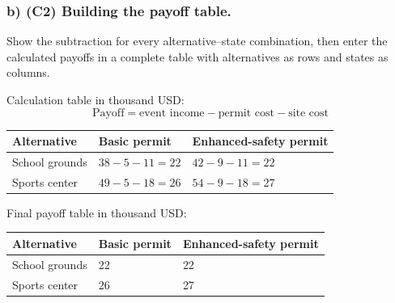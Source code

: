 \subsubsection*{b) \textbf{(C2)} Building the payoff table.}
\label{subsec:problem11-community-fair-venue-c2}
Show the subtraction for every alternative--state combination, then enter the calculated payoffs in a complete table with alternatives as rows and states as columns.

Calculation table in thousand USD:
\[
\text{Payoff}=\text{event income}-\text{permit cost}-\text{site cost}
\]
\begin{center}
\small
\begin{tabular}{lll}
\toprule
Alternative & Basic permit & Enhanced-safety permit \\
\midrule
School grounds & $38 - 5 - 11 = 22$ & $42 - 9 - 11 = 22$ \\
Sports center & $49 - 5 - 18 = 26$ & $54 - 9 - 18 = 27$ \\
\bottomrule
\end{tabular}
\end{center}

Final payoff table in thousand USD:
\begin{center}
\begin{tabular}{lll}
\toprule
Alternative & Basic permit & Enhanced-safety permit \\
\midrule
School grounds & 22 & 22 \\
Sports center & 26 & 27 \\
\bottomrule
\end{tabular}
\end{center}
